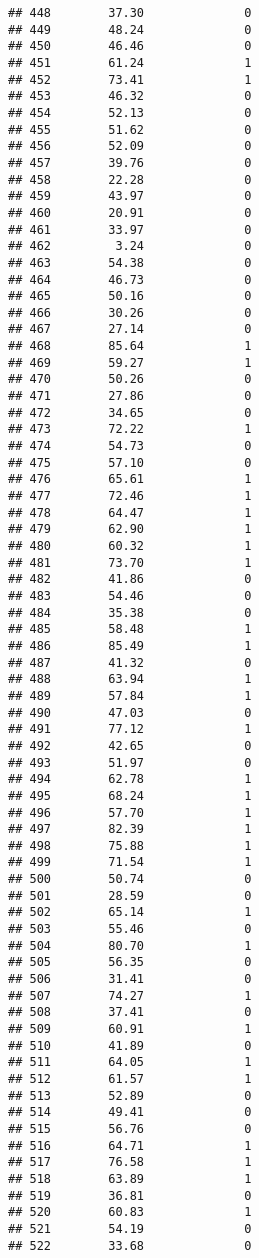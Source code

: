 \documentclass[
]{article}
\begin{document}
\begin{verbatim}
## 448        37.30              0
## 449        48.24              0
## 450        46.46              0
## 451        61.24              1
## 452        73.41              1
## 453        46.32              0
## 454        52.13              0
## 455        51.62              0
## 456        52.09              0
## 457        39.76              0
## 458        22.28              0
## 459        43.97              0
## 460        20.91              0
## 461        33.97              0
## 462         3.24              0
## 463        54.38              0
## 464        46.73              0
## 465        50.16              0
## 466        30.26              0
## 467        27.14              0
## 468        85.64              1
## 469        59.27              1
## 470        50.26              0
## 471        27.86              0
## 472        34.65              0
## 473        72.22              1
## 474        54.73              0
## 475        57.10              0
## 476        65.61              1
## 477        72.46              1
## 478        64.47              1
## 479        62.90              1
## 480        60.32              1
## 481        73.70              1
## 482        41.86              0
## 483        54.46              0
## 484        35.38              0
## 485        58.48              1
## 486        85.49              1
## 487        41.32              0
## 488        63.94              1
## 489        57.84              1
## 490        47.03              0
## 491        77.12              1
## 492        42.65              0
## 493        51.97              0
## 494        62.78              1
## 495        68.24              1
## 496        57.70              1
## 497        82.39              1
## 498        75.88              1
## 499        71.54              1
## 500        50.74              0
## 501        28.59              0
## 502        65.14              1
## 503        55.46              0
## 504        80.70              1
## 505        56.35              0
## 506        31.41              0
## 507        74.27              1
## 508        37.41              0
## 509        60.91              1
## 510        41.89              0
## 511        64.05              1
## 512        61.57              1
## 513        52.89              0
## 514        49.41              0
## 515        56.76              0
## 516        64.71              1
## 517        76.58              1
## 518        63.89              1
## 519        36.81              0
## 520        60.83              1
## 521        54.19              0
## 522        33.68              0

\end{verbatim}
\end{document}
